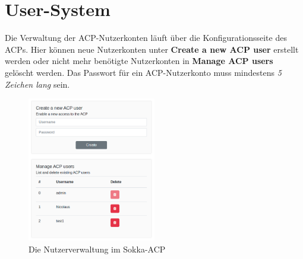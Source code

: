 \section{User-System}

Die Verwaltung der ACP-Nutzerkonten läuft über die Konfigurationsseite des ACPs. Hier können neue Nutzerkonten unter \textbf{Create a new ACP user} erstellt werden oder nicht mehr benötigte Nutzerkonten in \textbf{Manage ACP users} gelöscht werden. Das Passwort für ein ACP-Nutzerkonto muss mindestens \textit{5 Zeichen lang} sein.

\begin{figure}[ht]
    \centering
    \includegraphics[width=0.5\textwidth]{images/ACP/users.png}
    \caption{Die Nutzerverwaltung im Sokka-ACP}
\end{figure}

